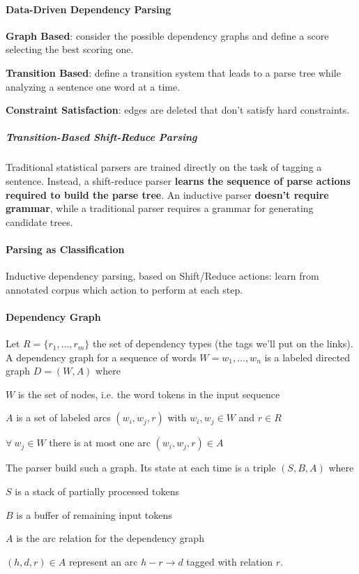 \documentclass[10pt]{report}
\begin{document}
\paragraph{Data-Driven Dependency Parsing}
\begin{list}{}{}
	\item \textbf{Graph Based}: consider the possible dependency graphs and define a score selecting the best scoring one.
	\item \textbf{Transition Based}: define a transition system that leads to a parse tree while analyzing a sentence one word at a time.
	\item \textbf{Constraint Satisfaction}: edges are deleted that don't satisfy hard constraints.
\end{list}
\subparagraph{Transition-Based Shift-Reduce Parsing}
Traditional statistical parsers are trained directly on the task of tagging a sentence. Instead, a shift-reduce parser \textbf{learns the sequence of parse actions required to build the parse tree}. An inductive parser \textbf{doesn't require grammar}, while a traditional parser requires a grammar for generating candidate trees.
\paragraph{Parsing as Classification} Inductive dependency parsing, based on Shift/Reduce actions: learn from annotated corpus which action to perform at each step.
\paragraph{Dependency Graph} Let $R = \{r_1,\ldots,r_m\}$ the set of dependency types (the tags we'll put on the links).\\
A dependency graph for a sequence of words $W = w_1,\ldots,w_n$ is a labeled directed graph $D = (W,A)$ where\begin{list}{}{}
	\item $W$ is the set of nodes, i.e. the word tokens in the input sequence
	\item $A$ is a set of labeled arcs $(w_i, w_j, r)$ with $w_i,w_j\in W$ and $r \in R$
	\item $\forall\:w_j\in W$ there is at most one arc $(w_i, w_j, r)\in A$
\end{list}
The parser build such a graph. Its state at each time is a triple $(S, B, A)$ where
\begin{list}{}{}
	\item $S$ is a stack of partially processed tokens
	\item $B$ is a buffer of remaining input tokens
	\item $A$ is the arc relation for the dependency graph
\end{list}
$(h,d,r)\in A$ represent an arc $h-r\rightarrow d$ tagged with relation $r$.
\end{document}

